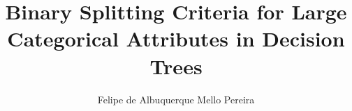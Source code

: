 \documentclass[msc,british,bibkey]{ThesisPUC_uk}
\author{\mbox{Felipe} \mbox{de} \mbox{Albuquerque} \mbox{Mello} \mbox{Pereira}}
\title{Binary Splitting Criteria for Large Categorical Attributes in Decision Trees}
\begin{document}
\newcommand{\remove}[1]{}
\newcommand{\dist}[3]{d(#1, #2)}
\newcommand{\distC}[2]{d(#1, #2)}
\newcommand{\OPT}[1]{\textrm{OPT}(#1)}
\newcommand{\OPTf}[2]{\textrm{OPT}(#1, #2)}
\newcommand{\Cf}[2]{\textrm{cost}(#1, #2)}
\newcommand{\C}[1]{\textrm{cost}(#1)}
\newcommand{\ans}[1]{\textbf{#1}}
\newcommand{\bl}{\textrm{blocked}}
\newcommand{\un}{\textrm{unassigned}}
\newcommand{\comments}[1]{}
\newcommand{\commento}[1]{\marginpar{\tiny \flushleft{#1}}}
\newtheorem{lemma}{Lemma}








\begin{raggedright}
	
\end{raggedright}
\end{document}
